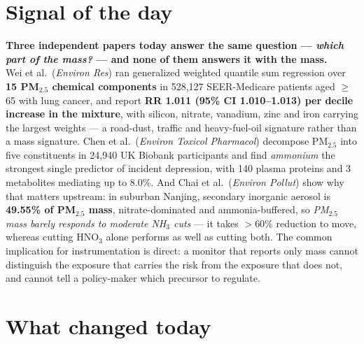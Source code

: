 \documentclass[10pt]{article}
\begin{document}
\vspace{6mm}

\section*{\sffamily\bfseries\color{Deep}Signal of the day}
\vspace{-1.5mm}{\color{Amber}\rule{\linewidth}{1.1pt}}\vspace{2.5mm}

\begin{keybox}
{\sffamily\bfseries\small\color{Deep}Three independent papers today answer the same
question --- \emph{which part of the mass?} --- and none of them answers it with the mass.}\\[1.4mm]
\footnotesize
Wei et al.\ (\textit{Environ Res}) ran generalized weighted quantile sum regression over
\textbf{15 PM$_{2.5}$ chemical components} in 528{,}127 SEER-Medicare patients aged
$\geq$65 with lung cancer, and report \textbf{RR 1.011 (95\% CI 1.010--1.013) per decile
increase in the mixture}, with silicon, nitrate, vanadium, zinc and iron carrying the
largest weights --- a road-dust, traffic and heavy-fuel-oil signature rather than a mass
signature. Chen et al.\ (\textit{Environ Toxicol Pharmacol}) decompose PM$_{2.5}$ into
five constituents in 24{,}940 UK Biobank participants and find \emph{ammonium} the
strongest single predictor of incident depression, with 140 plasma proteins and 3
metabolites mediating up to 8.0\%. And Chai et al.\ (\textit{Environ Pollut}) show why
that matters upstream: in suburban Nanjing, secondary inorganic aerosol is
\textbf{49.55\% of PM$_{2.5}$ mass}, nitrate-dominated and ammonia-buffered, so
\emph{PM$_{2.5}$ mass barely responds to moderate NH$_3$ cuts} --- it takes $>$60\%
reduction to move, whereas cutting HNO$_3$ alone performs as well as cutting both.
The common implication for instrumentation is direct: a monitor that reports only mass
cannot distinguish the exposure that carries the risk from the exposure that does not,
and cannot tell a policy-maker which precursor to regulate.
\end{keybox}

\vspace{3mm}

\section*{\sffamily\bfseries\color{Deep}What changed today}
\vspace{-1.5mm}{\color{Amber}\rule{\linewidth}{1.1pt}}\vspace{2.5mm}
\end{document}
